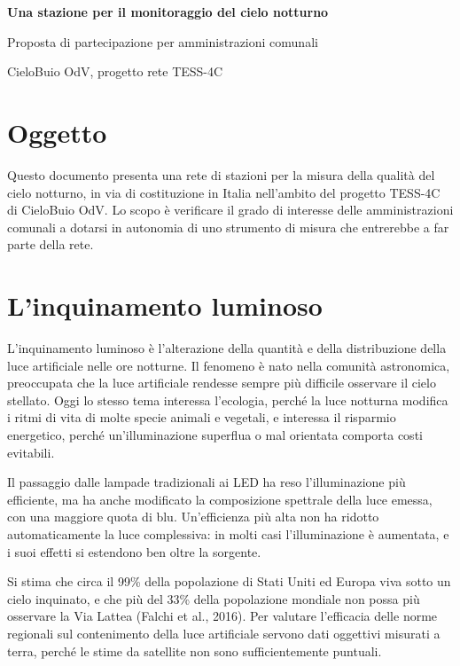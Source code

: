 \documentclass[11pt,a4paper]{report}
\begin{document}
\begin{center}

{\LARGE\bfseries\color{nightblue} Una stazione per il monitoraggio del cielo notturno\par}

\vspace{0.2cm}

{\large Proposta di partecipazione per amministrazioni comunali\par}

\vspace{0.1cm}

{\small CieloBuio OdV, progetto rete TESS-4C}

\end{center}

\section*{Oggetto}

Questo documento presenta una rete di stazioni per la misura della qualità del cielo notturno, in via di costituzione in Italia nell'ambito del progetto TESS-4C di CieloBuio OdV. Lo scopo è verificare il grado di interesse delle amministrazioni comunali a dotarsi in autonomia di uno strumento di misura che entrerebbe a far parte della rete.

\section*{L'inquinamento luminoso}

L'inquinamento luminoso è l'alterazione della quantità e della distribuzione della luce artificiale nelle ore notturne. Il fenomeno è nato nella comunità astronomica, preoccupata che la luce artificiale rendesse sempre più difficile osservare il cielo stellato. Oggi lo stesso tema interessa l'ecologia, perché la luce notturna modifica i ritmi di vita di molte specie animali e vegetali, e interessa il risparmio energetico, perché un'illuminazione superflua o mal orientata comporta costi evitabili.

Il passaggio dalle lampade tradizionali ai LED ha reso l'illuminazione più efficiente, ma ha anche modificato la composizione spettrale della luce emessa, con una maggiore quota di blu. Un'efficienza più alta non ha ridotto automaticamente la luce complessiva: in molti casi l'illuminazione è aumentata, e i suoi effetti si estendono ben oltre la sorgente.

Si stima che circa il 99\% della popolazione di Stati Uniti ed Europa viva sotto un cielo inquinato, e che più del 33\% della popolazione mondiale non possa più osservare la Via Lattea (Falchi et al., 2016). Per valutare l'efficacia delle norme regionali sul contenimento della luce artificiale servono dati oggettivi misurati a terra, perché le stime da satellite non sono sufficientemente puntuali.
\end{document}
